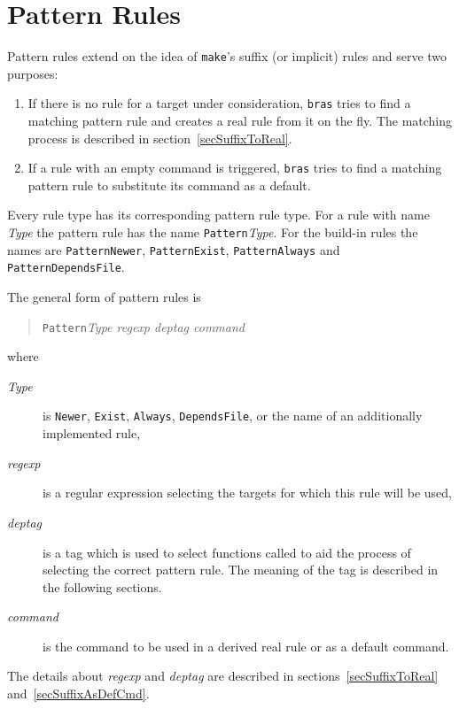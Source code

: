 \documentclass[12pt]{article}
\newcommand{\bras}{\texttt{bras}}
\newcommand{\make}{\texttt{make}}
\begin{document}
\section{Pattern Rules}

Pattern rules extend on the idea of \make's suffix (or implicit)
rules and serve two purposes:

\begin{enumerate}
\item 
If there is no rule for a target under consideration, \bras{}
tries to find a matching pattern rule and creates a real rule from it on
the fly. The matching process is described in
section~\ref{secSuffixToReal}.
\item 
If a rule with an empty command is triggered, \bras{} tries
to find a matching pattern rule to substitute its command as a default.
\end{enumerate}

Every rule type has its corresponding pattern rule type. 
For a rule with name \textit{Type} the pattern rule has the name
\texttt{Pattern}\textit{Type}. For the build-in rules the names are
\texttt{PatternNewer}, \texttt{PatternExist},
\texttt{PatternAlways} and \texttt{PatternDependsFile}.

The general form of pattern rules is
\begin{quote}
\texttt{Pattern}\textit{Type regexp deptag command}
\end{quote}

where 

\begin{description}
\item[\textit{Type}] 
  is \texttt{Newer}, \texttt{Exist},
  \texttt{Always}, \texttt{DependsFile}, or the name of an additionally
  implemented rule, 
\item[\textit{regexp}] 
  is a regular expression selecting the targets
  for which this rule will be used,
\item[\textit{deptag}]
  is a tag which is used to select functions called to aid the
  process of selecting the correct pattern rule. The meaning of the
  tag is described in the following sections.
\item[\textit{command}] 
  is the command to be used in a derived real
  rule or as a default command.
\end{description}

The details about \textit{regexp} and \textit{deptag} are described
in sections~\ref{secSuffixToReal} and~\ref{secSuffixAsDefCmd}.
\end{document}
